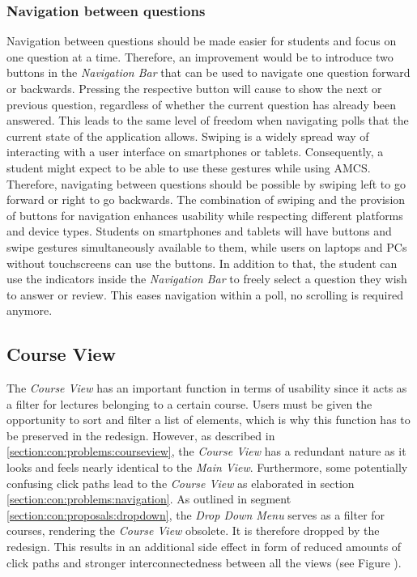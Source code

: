 \subsubsection{Navigation between questions}

Navigation between questions should be made easier for students and focus on one question at a time. Therefore, an improvement would be to introduce two buttons in the \emph{Navigation Bar} that can be used to navigate one question forward or backwards. Pressing the respective button will cause to show the next or previous question, regardless of whether the current question has already been answered. This leads to the same level of freedom when navigating polls that the current state of the application allows.
\newline
\newline
Swiping is a widely spread way of interacting with a user interface on smartphones or tablets. Consequently, a student might expect to be able to use these gestures while using AMCS. Therefore, navigating between questions should be possible by swiping left to go forward or right to go backwards. The combination of swiping and the provision of buttons for navigation enhances usability while respecting different platforms and device types. Students on smartphones and tablets will have buttons and swipe gestures simultaneously available to them, while users on laptops and PCs without touchscreens can use the buttons.
In addition to that, the student can use the indicators inside the \emph{Navigation Bar} to freely select a question they wish to answer or review. This eases navigation within a poll, no scrolling is required anymore.


\subsection{Course View}
The \emph{Course View} has an important function in terms of usability since it acts as a filter for lectures belonging to a certain course. Users must be given the opportunity to sort and filter a list of elements, which is why this function has to be preserved in the redesign. However, as described in \ref{section:con:problems:courseview}, the \emph{Course View} has a redundant nature as it looks and feels nearly identical to the \emph{Main View}.
Furthermore, some potentially confusing click paths lead to the \emph{Course View} as elaborated in section \ref{section:con:problems:navigation}.
As outlined in segment \ref{section:con:proposals:dropdown}, the \emph{Drop Down Menu} serves as a filter for courses, rendering the \emph{Course View} obsolete. It is therefore dropped by the redesign. This results in an additional side effect in form of reduced amounts of click paths and stronger interconnectedness between all the views (see Figure \todosct).
